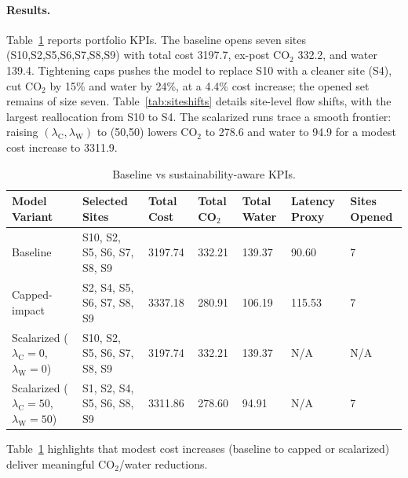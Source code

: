 \paragraph{Results.} Table~\ref{tab:kpi} reports portfolio KPIs. The baseline opens seven sites (S10,S2,S5,S6,S7,S8,S9) with total cost 3197.7, ex-post CO$_2$ 332.2, and water 139.4. Tightening caps pushes the model to replace S10 with a cleaner site (S4), cut CO$_2$ by 15\% and water by 24\%, at a 4.4\% cost increase; the opened set remains of size seven. Table~\ref{tab:siteshifts} details site-level flow shifts, with the largest reallocation from S10 to S4. The scalarized runs trace a smooth frontier: raising $(\lambda_{\mathrm{C}},\lambda_{\mathrm{W}})$ to (50,50) lowers CO$_2$ to 278.6 and water to 94.9 for a modest cost increase to 3311.9.

\begin{table}[t]
  \centering
  \caption{Baseline vs sustainability-aware KPIs.}
  \label{tab:kpi}
  \begin{tabular}{lllllll}
    \toprule
    Model Variant & Selected Sites & Total Cost & Total CO$_2$ & Total Water & Latency Proxy & Sites Opened \\
    \midrule
    Baseline & S10, S2, S5, S6, S7, S8, S9 & 3197.74 & 332.21 & 139.37 & 90.60 & 7 \\
    Capped-impact & S2, S4, S5, S6, S7, S8, S9 & 3337.18 & 280.91 & 106.19 & 115.53 & 7 \\
    Scalarized ($\lambda_{\mathrm{C}}{=}0$, $\lambda_{\mathrm{W}}{=}0$) & S10, S2, S5, S6, S7, S8, S9 & 3197.74 & 332.21 & 139.37 & N/A & N/A \\
    Scalarized ($\lambda_{\mathrm{C}}{=}50$, $\lambda_{\mathrm{W}}{=}50$) & S1, S2, S4, S5, S6, S8, S9 & 3311.86 & 278.60 & 94.91 & N/A & 7 \\
    \bottomrule
  \end{tabular}
\end{table}
Table~\ref{tab:kpi} highlights that modest cost increases (baseline to capped or scalarized) deliver meaningful CO$_2$/water reductions.

